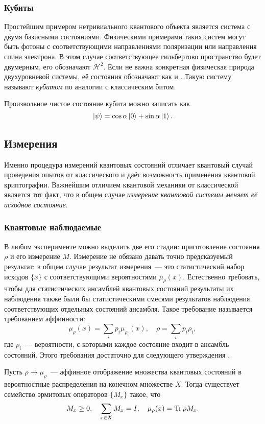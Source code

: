 \subsubsection{Кубиты}
Простейшим примером нетривиального квантового объекта является система с двумя базисными состояниями. 
Физическими примерами таких систем могут быть фотоны с соответствующими направлениями поляризации или направления спина электрона.
В этом случае соответствующее гильбертово пространство будет двумерным, его обозначают $\mathcal H^2$.
Если не важна конкретная физическая природа двухуровневой системы, её состояния обозначают как 
 и . Такую систему называют \textit{кубитом} по аналогии с классическим битом.

Произвольное чистое состояние кубита можно записать как
\begin{equation} \left| \psi \right\rangle = \cos \alpha \left| 0 \right\rangle + \sin \alpha \left| 1 \right\rangle. \end{equation}

\subsection{Измерения}
Именно процедура измерений квантовых состояний отличает квантовый случай проведения опытов от классического и даёт возможность применения квантовой криптографии. Важнейшим отличием квантовой механики от классической является тот факт, что в общем случае \textit{измерение квантовой системы меняет её исходное состояние}.

\subsubsection{Квантовые наблюдаемые}
В любом эксперименте можно выделить две его стадии: приготовление состояния $\rho$ и его измерение $M$. Измерение не обязано давать точно предсказуемый результат: в общем случае результат измерения~--- это статистический набор исходов $\{x\}$ с соответствующими вероятностями $\mu_\rho(x)$. Естественно требовать, чтобы для статистических ансамблей квантовых состояний результаты их наблюдения также были бы статистическими смесями результатов наблюдения соответствующих отдельных состояний ансамбля. Такое требование называется требованием аффинности:
\begin{equation} \mu_\rho(x) = \sum_i p_i \mu_{\rho_i}(x),\quad \rho = \sum_i p_i \rho_i, \end{equation}
где $p_i$~--- вероятности, с которыми каждое состояние входит в ансамбль состояний.
Этого требования достаточно для следующего утверждения \cite{holevo}.
\begin{theorem}
  Пусть $\rho \rightarrow \mu_\rho$~--- аффинное отображение множества квантовых состояний в вероятностные распределения на конечном множестве $X$. Тогда существует семейство эрмитовых операторов $\{M_x\}$ такое, что
  \begin{equation} M_x \ge 0,\quad \sum_{x \in X} M_x = I,\quad \mu_\rho(x) = \operatorname{Tr} \rho M_x. \end{equation}
\end{theorem}


